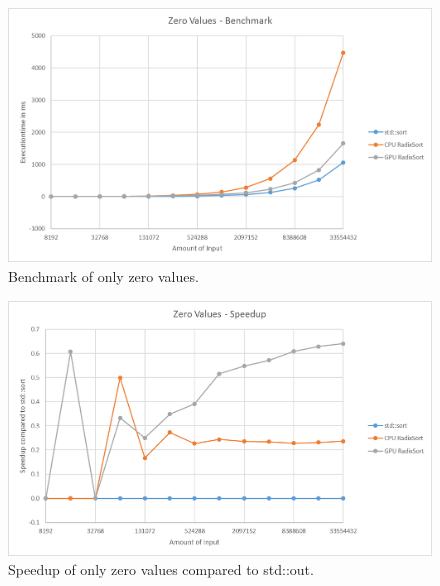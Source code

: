 \documentclass{llncs}
\begin{document}
\begin{figure}
  \begin{center}
    \includegraphics[width=\columnwidth]{charts/zero_benchmark.png}
  \end{center}
  \caption{Benchmark of only zero values.}\label{fig:zero_bench}
\end{figure}

\begin{figure}
  \begin{center}
    \includegraphics[width=\columnwidth]{charts/zero_speedup.png}
  \end{center}
  \caption{Speedup of only zero values compared to std::out.}\label{fig:zero_speedup}
\end{figure}
\end{document}
